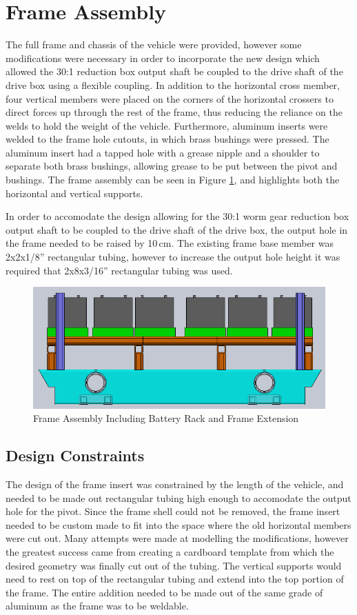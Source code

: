 \section{Frame Assembly}
The full frame and chassis of the vehicle were provided, however some modifications were necessary in order to incorporate the new design which allowed the 30:1 reduction box output shaft be coupled to the drive shaft of the drive box using a flexible coupling. In addition to the horizontal cross member, four vertical members were placed on the corners of the horizontal crossers to direct forces up through the rest of the frame, thus reducing the reliance on the welds to hold the weight of the vehicle. Furthermore, aluminum inserts were welded to the frame hole cutouts, in which brass bushings were pressed. The aluminum insert had a tapped hole with a grease nipple and a shoulder to separate both brass bushings, allowing grease to be put between the pivot and bushings. The frame assembly can be seen in Figure \ref{fig:battery_rack_and_frame_mount_drw}, and highlights both the horizontal and vertical supports. 

In order to accomodate the design allowing for the 30:1 worm gear reduction box output shaft to be coupled to the drive shaft of the drive box, the output hole in the frame needed to be raised by 10\,cm. The existing frame base member was 2x2x1/8'' rectangular tubing, however to increase the output hole height it was required that 2x8x3/16'' rectangular tubing was used. 

\begin{figure}[h]
\centering
\includegraphics[width=0.7\linewidth]{./images/battery_rack_and_frame_mount_drw}
\caption{Frame Assembly Including Battery Rack and Frame Extension}
\label{fig:battery_rack_and_frame_mount_drw}
\end{figure}
 
\subsection{Design Constraints}
The design of the frame insert was constrained by the length of the vehicle, and needed to be made out rectangular tubing high enough to accomodate the output hole for the pivot. Since the frame shell could not be removed, the frame insert needed to be custom made to fit into the space where the old horizontal members were cut out. Many attempts were made at modelling the modifications, however the greatest success came from creating a cardboard template from which the desired geometry was finally cut out of the tubing. The vertical supports would need to rest on top of the rectangular tubing and extend into the top portion of the frame. The entire addition needed to be made out of the same grade of aluminum as the frame was to be weldable. 
